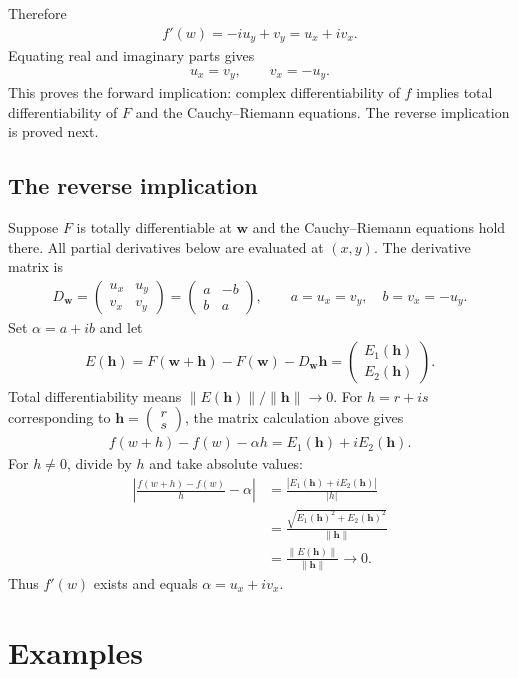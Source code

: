 \documentclass[11pt]{article}
\theoremstyle{plain}
\theoremstyle{definition}
\theoremstyle{remark}
\numberwithin{equation}{section}
\newcommand{\be}{\begin{eqnarray}}
\newcommand{\ee}{\end{eqnarray}}
\newcommand{\ww}{\mathbf w}
\newcommand{\hh}{\mathbf h}
\begin{document}
Therefore
\be
 \boxed{f'(w)=-iu_y+v_y=u_x+iv_x.}
\ee
Equating real and imaginary parts gives
\be
 \boxed{u_x=v_y,\qquad v_x=-u_y.}
\ee
This proves the forward implication: complex differentiability of $f$
implies total differentiability of $F$ and the Cauchy--Riemann equations.
The reverse implication is proved next.

\subsection*{The reverse implication}

Suppose $F$ is totally differentiable at $\ww$ and the Cauchy--Riemann
equations hold there. All partial derivatives below are evaluated at
$(x,y)$. The derivative matrix is
\be
 D_{\ww}=\begin{pmatrix}u_x&u_y\\v_x&v_y\end{pmatrix}
 =\begin{pmatrix}a&-b\\b&a\end{pmatrix},
 \qquad a=u_x=v_y,\quad b=v_x=-u_y.
\ee
Set $\alpha=a+ib$ and let
\be
 E(\hh)=F(\ww+\hh)-F(\ww)-D_{\ww}\hh
 =\begin{pmatrix}E_1(\hh)\\E_2(\hh)\end{pmatrix}.
\ee
Total differentiability means $\|E(\hh)\|/\|\hh\|\to0$.
For $h=r+is$ corresponding to $\hh=\begin{pmatrix}r\\s\end{pmatrix}$, the matrix
calculation above gives
\be
 f(w+h)-f(w)-\alpha h=E_1(\hh)+iE_2(\hh).
\ee
For $h\ne0$, divide by $h$ and take absolute values:
\begin{align*}
 \left|\frac{f(w+h)-f(w)}h-\alpha\right|
 &=\frac{|E_1(\hh)+iE_2(\hh)|}{|h|}\\
 &=\frac{\sqrt{E_1(\hh)^2+E_2(\hh)^2}}{\|\hh\|}\\
 &=\frac{\|E(\hh)\|}{\|\hh\|}\longrightarrow0.
\end{align*}
Thus $f'(w)$ exists and equals $\alpha=u_x+iv_x$.

\section{Examples}
\end{document}
